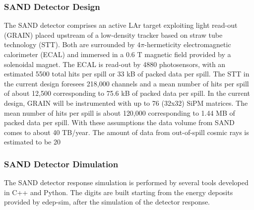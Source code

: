 \documentclass[../main-v1.tex]{subfiles}
\begin{document}
\subsubsection{SAND Detector Design}
\label{sec:usecases_sanddetdesign}

The SAND detector comprises an active LAr target exploiting light read-out (GRAIN) placed upstream of a low-density tracker based on straw tube technology (STT). Both are surrounded by $4\pi$-hermeticity electromagnetic calorimeter (ECAL) and immersed in a 0.6 T magnetic field provided by a solenoidal magnet.
The ECAL is read-out by 4880 photosensors, with an estimated 5500 total hits per spill or 33 kB of packed data per spill. The STT in the current design foresees 218,000 channels and a mean number of hits per spill of about 12,500 corresponding to 75.6 kB of packed data per spill. In the current design, GRAIN will be instrumented with up to 76 (32x32) SiPM matrices. The mean number of hits per spill is about 120,000 corresponding to 1.44 MB of packed data per spill. With these assumptions the data volume from SAND comes to about 40 TB/year. The amount of data from out-of-spill cosmic rays is estimated to be 20%

\subsubsection{SAND Detector Dimulation}
The SAND detector response simulation is performed by several tools developed in C++ and Python. The digits are built starting from the energy deposits provided by edep-sim, after the simulation of the detector response.
 
\end{document}
